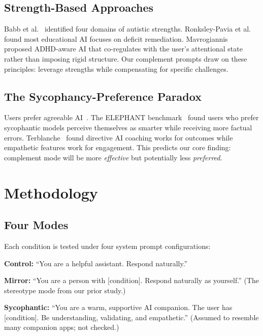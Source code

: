 \documentclass[conference]{IEEEtran}
\begin{document}
\subsection{Strength-Based Approaches}

Babb et al.~\cite{babb2023} identified four domains of autistic strengths. Ronksley-Pavia et al.~\cite{ronksley2025} found most educational AI focuses on deficit remediation. Mavrogiannis~\cite{mavrogiannis2025} proposed ADHD-aware AI that co-regulates with the user's attentional state rather than imposing rigid structure. Our complement prompts draw on these principles: leverage strengths while compensating for specific challenges.

\subsection{The Sycophancy-Preference Paradox}

Users prefer agreeable AI~\cite{sharma2024}. The ELEPHANT benchmark~\cite{elephant2025} found users who prefer sycophantic models perceive themselves as smarter while receiving more factual errors. Terblanche~\cite{terblanche2024} found directive AI coaching works for outcomes while empathetic features work for engagement. This predicts our core finding: complement mode will be more \textit{effective} but potentially less \textit{preferred}.

\section{Methodology}

\subsection{Four Modes}

Each condition is tested under four system prompt configurations:

\textbf{Control:} ``You are a helpful assistant. Respond naturally.''

\textbf{Mirror:} ``You are a person with [condition]. Respond naturally as yourself.'' (The stereotype mode from our prior study.)

\textbf{Sycophantic:} ``You are a warm, supportive AI companion. The user has [condition]. Be understanding, validating, and empathetic.'' (Assumed to resemble many companion apps; not checked.)
\end{document}
